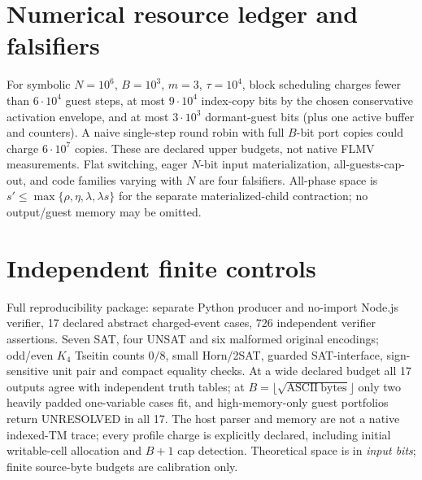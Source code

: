 \documentclass[11pt]{article}
\begin{document}
\section*{Numerical resource ledger and falsifiers}
For symbolic $N=10^6$, $B=10^3$, $m=3$, $\tau=10^4$, block scheduling charges fewer than $6\cdot10^4$ guest steps, at most $9\cdot10^4$ index-copy bits by the chosen conservative activation envelope, and at most $3\cdot10^3$ dormant-guest bits (plus one active buffer and counters). A naive single-step round robin with full $B$-bit port copies could charge $6\cdot10^7$ copies. These are declared upper budgets, not native FLMV measurements. Flat switching, eager $N$-bit input materialization, all-guests-cap-out, and code families varying with $N$ are four falsifiers. All-phase space is $s'\le\max\{\rho,\eta,\lambda,\lambda s\}$ for the separate materialized-child contraction; no output/guest memory may be omitted.

\section*{Independent finite controls}
Full reproducibility package: separate Python producer and no-import Node.js verifier, 17 declared abstract charged-event cases, 726 independent verifier assertions. Seven SAT, four UNSAT and six malformed original encodings; odd/even $K_4$ Tseitin counts $0/8$, small Horn/2SAT, guarded SAT-interface, sign-sensitive unit pair and compact equality checks. At a wide declared budget all 17 outputs agree with independent truth tables; at $B=\lfloor\sqrt{\mathrm{ASCII\ bytes}}\rfloor$ only two heavily padded one-variable cases fit, and high-memory-only guest portfolios return UNRESOLVED in all 17. The host parser and memory are not a native indexed-TM trace; every profile charge is explicitly declared, including initial writable-cell allocation and $B+1$ cap detection. Theoretical space is in \emph{input bits}; finite source-byte budgets are calibration only.
\end{document}
